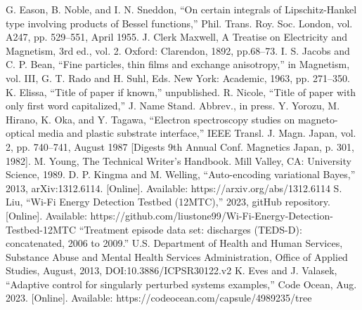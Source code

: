 \documentclass[conference]{IEEEtran}
\begin{document}
\begin{thebibliography}{00}
     G. Eason, B. Noble, and I. N. Sneddon, ``On certain integrals of Lipschitz-Hankel type involving products of Bessel functions,'' Phil. Trans. Roy. Soc. London, vol. A247, pp. 529--551, April 1955.
     J. Clerk Maxwell, A Treatise on Electricity and Magnetism, 3rd ed., vol. 2. Oxford: Clarendon, 1892, pp.68--73.
     I. S. Jacobs and C. P. Bean, ``Fine particles, thin films and exchange anisotropy,'' in Magnetism, vol. III, G. T. Rado and H. Suhl, Eds. New York: Academic, 1963, pp. 271--350.
     K. Elissa, ``Title of paper if known,'' unpublished.
     R. Nicole, ``Title of paper with only first word capitalized,'' J. Name Stand. Abbrev., in press.
     Y. Yorozu, M. Hirano, K. Oka, and Y. Tagawa, ``Electron spectroscopy studies on magneto-optical media and plastic substrate interface,'' IEEE Transl. J. Magn. Japan, vol. 2, pp. 740--741, August 1987 [Digests 9th Annual Conf. Magnetics Japan, p. 301, 1982].
     M. Young, The Technical Writer's Handbook. Mill Valley, CA: University Science, 1989.
     D. P. Kingma and M. Welling, ``Auto-encoding variational Bayes,'' 2013, arXiv:1312.6114. [Online]. Available: https://arxiv.org/abs/1312.6114
     S. Liu, ``Wi-Fi Energy Detection Testbed (12MTC),'' 2023, gitHub repository. [Online]. Available: https://github.com/liustone99/Wi-Fi-Energy-Detection-Testbed-12MTC
     ``Treatment episode data set: discharges (TEDS-D): concatenated, 2006 to 2009.'' U.S. Department of Health and Human Services, Substance Abuse and Mental Health Services Administration, Office of Applied Studies, August, 2013, DOI:10.3886/ICPSR30122.v2
     K. Eves and J. Valasek, ``Adaptive control for singularly perturbed systems examples,'' Code Ocean, Aug. 2023. [Online]. Available: https://codeocean.com/capsule/4989235/tree
    \end{thebibliography}
\end{document}
